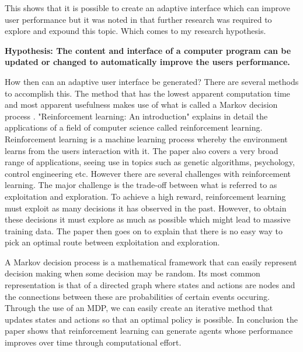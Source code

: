 \documentclass[11pt]{article}
\begin{document}
This shows that it is possible to create an adaptive interface which can improve user performance but it was noted in \citep{lavie2010benefits} that further research was required to explore and expound this topic. Which comes to my research hypothesis.

\begin{center}
\textbf{
Hypothesis: The content and interface of a computer program can be updated or changed to automatically improve the users performance.}
\end{center}

How then can an adaptive user interface be generated? There are several methods to accomplish this. The method that has the lowest apparent computation time and most apparent usefulness makes use of what is called a Markov decision process \citep{barto1998reinforcement}. "Reinforcement learning: An introduction"  \citep{barto1998reinforcement} explains in detail the applications of a field of computer science called reinforcement learning. Reinforcement learning is a machine learning process whereby the environment learns from the users interaction with it. The paper also covers a very broad range of applications, seeing use in topics such as genetic algorithms, psychology, control engineering etc. However there are several challenges with reinforcement learning. The major challenge is the trade-off between what is referred to as exploitation and exploration. To achieve a high reward, reinforcement learning must exploit as many decisions it has observed in the past. However, to obtain these decisions it must explore as much as possible which might lead to massive training data. The paper then goes on to explain that there is no easy way to pick an optimal route between exploitation and exploration.
\vspace{6.0 mm}


A Markov decision process is a mathematical framework that can easily represent decision making when some decision may be random. Its most common representation is that of a directed graph where states and actions are nodes and the connections between these are probabilities of certain events occuring. Through the use of an MDP, we can easily create an iterative method that updates states and actions so that an optimal policy is possible. In conclusion the paper shows that reinforcement learning can generate agents  whose performance improves over time through computational effort.\citep{white1991survey}
\vspace{6.0 mm}
\end{document}
